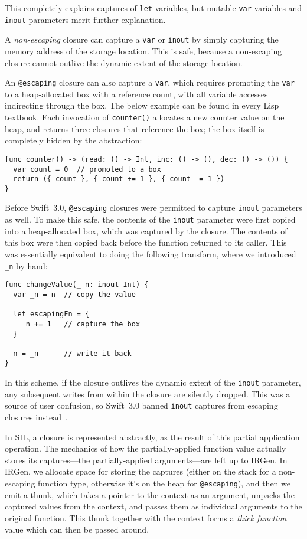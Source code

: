 \documentclass[../generics]{subfiles}
\begin{document}
This completely explains captures of \texttt{let} variables, but mutable \texttt{var} variables and \texttt{inout} parameters merit further explanation.

A \emph{non-escaping} closure can capture a \texttt{var} or \texttt{inout} by simply capturing the memory address of the storage location. This is safe, because a non-escaping closure cannot outlive the dynamic extent of the storage location.

An \texttt{@escaping} closure can also capture a \texttt{var}, which requires promoting the \texttt{var} to a heap-allocated box with a reference count, with all variable accesses indirecting through the box. The below example can be found in every Lisp textbook. Each invocation of \texttt{counter()} allocates a new counter value on the heap, and returns three closures that reference the box; the box itself is completely hidden by the abstraction:
\begin{Verbatim}
func counter() -> (read: () -> Int, inc: () -> (), dec: () -> ()) {
  var count = 0  // promoted to a box
  return ({ count }, { count += 1 }, { count -= 1 })
}
\end{Verbatim}

Before Swift~3.0, \texttt{@escaping} closures were permitted to capture \texttt{inout} parameters as well. To make this safe, the contents of the \texttt{inout} parameter were first copied into a heap-allocated box, which was captured by the closure. The contents of this box were then copied back before the function returned to its caller. This was essentially equivalent to doing the following transform, where we introduced \verb|_n| by hand:
\begin{Verbatim}
func changeValue(_ n: inout Int) {
  var _n = n  // copy the value

  let escapingFn = {
    _n += 1   // capture the box
  }

  n = _n      // write it back
}
\end{Verbatim}
In this scheme, if the closure outlives the dynamic extent of the \texttt{inout} parameter, any subsequent writes from within the closure are silently dropped. This was a source of user confusion, so Swift~3.0 banned \texttt{inout} captures from escaping closures instead~\cite{se0035}.

In SIL, a closure is represented abstractly, as the result of this partial application operation. The mechanics of how the partially-applied function value actually stores its captures---the partially-applied arguments---are left up to IRGen. In IRGen, we allocate space for storing the captures (either on the stack for a non-escaping function type, otherwise it's on the heap for \texttt{@escaping}), and then we emit a thunk, which takes a pointer to the context as an argument, unpacks the captured values from the context, and passes them as individual arguments to the original function. This thunk together with the context forms a \emph{thick function} value which can then be passed around.
\end{document}
